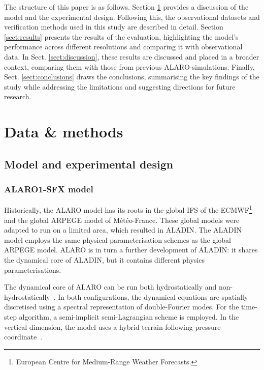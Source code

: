 \documentclass[journal abbreviation, manuscript]{copernicus}
\begin{document}
The structure of this paper is as follows. Section \ref{sect:data_methods} provides a discussion of the model and the experimental design. 
Following this, the observational datasets and verification methods used in this study are described in detail. 
Section \ref{sect:results} presents the results of the evaluation, highlighting the model's performance across different resolutions and comparing it with observational data. 
In Sect. \ref{sect:discussion}, these results are discussed and placed in a broader context, comparing them with those from previous ALARO-simulations.
Finally, Sect. \ref{sect:conclusions} draws the conclusions, summarising the key findings of the study while addressing the limitations and suggesting directions for future research.


\section{Data \& methods}
\label{sect:data_methods}

\subsection{Model and experimental design}

\subsubsection{ALARO1-SFX model}

Historically, the ALARO model has its roots in the global IFS of the ECMWF\footnote{European Centre for Medium-Range Weather Forecasts.} and the global ARPEGE model of Météo-France.
These global models were adapted to run on a limited area, which resulted in ALADIN.
The ALADIN model employs the same physical parameterisation schemes as the global ARPEGE model.
ALARO is in turn a further development of ALADIN: it shares the dynamical core of ALADIN, but it contains different physics parameterisations.

The dynamical core of ALARO can be run both hydrostatically and non-hydrostatically~\citep{bubnova_integration_1995, termonia_aladin_2018}. 
In both configurations, the dynamical equations are spatially discretised using a spectral representation of double-Fourier modes.
For the time-step algorithm, a semi-implicit semi-Lagrangian scheme is employed. 
In the vertical dimension, the model uses a hybrid terrain-following pressure coordinate~\citep{simmons_energy_1981, laprise_euler_1992}. 
\end{document}
